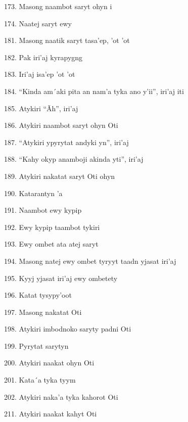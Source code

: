 173. Masong naambot saryt ohyn i

174. Naatej saryt ewy

181. Masong naatik saryt tasa'ep, 'ot 'ot

182. Pak iri'aj kyrapygng

183. Iri'aj isa'ep 'ot 'ot

184. ``Kinda am´aki pita an nam'a tyka ano y'ii'', iri'aj iti

185. Atykiri ``Ãh'', iri'aj

186. Atykiri naambot saryt ohyn Oti

187. ``Atykiri ypyrytat andyki yn'', iri'aj

188. ``Kahy okyp anamboji akinda yti'', iri'aj

189. Atykiri nakatat saryt Oti ohyn

190. Katarantyn 'a

191. Naambot ewy kypip

192. Ewy kypip taambot tykiri

193. Ewy ombet ata atej saryt

194. Masong natej ewy ombet tyryyt taadn yjasat iri'aj

195. Kyyj yjasat iri'aj ewy ombetety

196. Katat tysypy'oot

197. Masong nakatat Oti

198. Atykiri imbodnoko saryty padni Oti

199. Pyrytat sarytyn

200. Atykiri naakat ohyn Oti

201. Kata´a tyka tyym

202. Atykiri naka'a tyka kahorot Oti

211. Atykiri naakat kahyt Oti